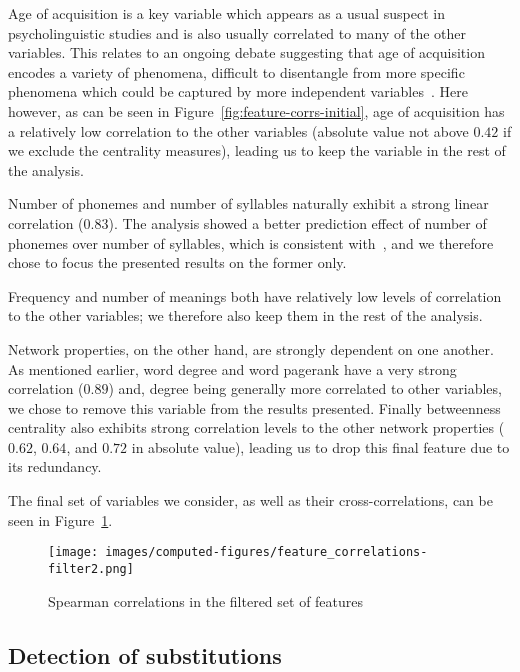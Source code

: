 
Age of acquisition is a key variable which appears as a usual suspect in psycholinguistic studies and is also usually correlated to many of the other variables.
This relates to an ongoing debate suggesting that age of acquisition encodes a variety of phenomena, difficult to disentangle from more specific phenomena which could be captured by more independent variables~\CN{}.
Here however, as can be seen in Figure~\ref{fig:feature-corrs-initial}, age of acquisition has a relatively low correlation to the other variables (absolute value not above $0.42$ if we exclude the centrality measures), leading us to keep the variable in the rest of the analysis.

Number of phonemes and number of syllables naturally exhibit a strong linear correlation ($0.83$).
The analysis showed a better prediction effect of number of phonemes over number of syllables, which is consistent with~\citet{nick-diss}, and we therefore chose to focus the presented results on the former only.

Frequency and number of meanings both have relatively low levels of correlation to the other variables; we therefore also keep them in the rest of the analysis.

\bigskip
Network properties, on the other hand, are strongly dependent on one another.
As mentioned earlier, word degree and word pagerank have a very strong correlation ($0.89$) and, degree being generally more correlated to other variables, we chose to remove this variable from the results presented.
Finally betweenness centrality also exhibits strong correlation levels to the other network properties ($0.62$, $0.64$, and $0.72$ in absolute value), leading us to drop this final feature due to its redundancy.

The final set of variables we consider, as well as their cross-correlations, can be seen in Figure~\ref{fig:feature-corrs-filtered}.

\begin{figure}[!th]
    \centering
    \texttt{[image: images/computed-figures/feature\_correlations-filter2.png]}
    \caption{Spearman correlations in the filtered set of features}
    \label{fig:feature-corrs-filtered}
\end{figure}


\subsection{Detection of substitutions}

